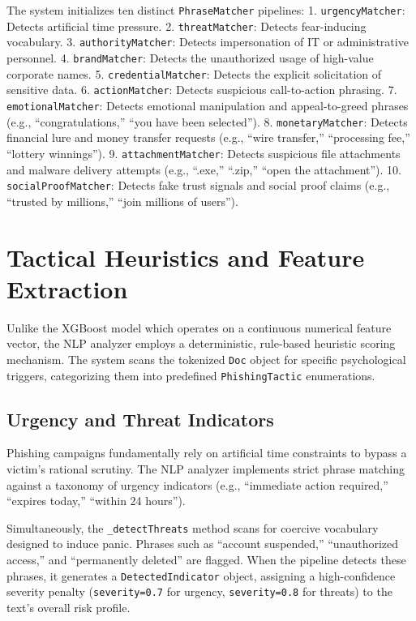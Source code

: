 The system initializes ten distinct \texttt{PhraseMatcher} pipelines: 1.
\texttt{urgencyMatcher}: Detects artificial time pressure. 2.
\texttt{threatMatcher}: Detects fear-inducing vocabulary. 3.
\texttt{authorityMatcher}: Detects impersonation of IT or administrative
personnel. 4. \texttt{brandMatcher}: Detects the unauthorized usage of
high-value corporate names. 5. \texttt{credentialMatcher}: Detects the
explicit solicitation of sensitive data. 6. \texttt{actionMatcher}:
Detects suspicious call-to-action phrasing. 7. \texttt{emotionalMatcher}:
Detects emotional manipulation and appeal-to-greed phrases (e.g.,
``congratulations,'' ``you have been selected''). 8.
\texttt{monetaryMatcher}: Detects financial lure and money transfer
requests (e.g., ``wire transfer,'' ``processing fee,'' ``lottery
winnings''). 9. \texttt{attachmentMatcher}: Detects suspicious file
attachments and malware delivery attempts (e.g., ``.exe,'' ``.zip,'' ``open
the attachment''). 10. \texttt{socialProofMatcher}: Detects fake trust
signals and social proof claims (e.g., ``trusted by millions,'' ``join
millions of users'').

\section{Tactical Heuristics and Feature
Extraction}\label{tactical-heuristics-and-feature-extraction}

Unlike the XGBoost model which operates on a continuous numerical
feature vector, the NLP analyzer employs a deterministic, rule-based
heuristic scoring mechanism. The system scans the tokenized \texttt{Doc}
object for specific psychological triggers, categorizing them into
predefined \texttt{PhishingTactic} enumerations.

\subsection{Urgency and Threat
Indicators}\label{urgency-and-threat-indicators}

Phishing campaigns fundamentally rely on artificial time constraints to
bypass a victim's rational scrutiny. The NLP analyzer implements strict
phrase matching against a taxonomy of urgency indicators (e.g.,
``immediate action required,'' ``expires today,'' ``within 24 hours'').

Simultaneously, the \texttt{\_detectThreats} method scans for coercive
vocabulary designed to induce panic. Phrases such as ``account
suspended,'' ``unauthorized access,'' and ``permanently deleted'' are
flagged. When the pipeline detects these phrases, it generates a
\texttt{DetectedIndicator} object, assigning a high-confidence severity
penalty (\texttt{severity=0.7} for urgency, \texttt{severity=0.8} for
threats) to the text's overall risk profile.

